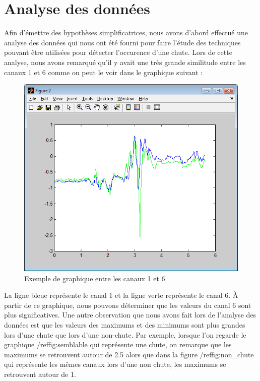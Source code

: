 \documentclass[12pt,letterpaper]{article}
\begin{document}
\section{Analyse des données} %
Afin d'émettre des hypothèses simplificatrices, nous avons d'abord effectué une analyse des données qui nous ont été fourni pour faire l'étude des techniques pouvant être utilisées pour détecter l'occurence d'une chute. Lors de cette analyse, nous avons remarqué qu'il y avait une très grande similitude entre les canaux 1 et 6 comme on peut le voir dans le graphique suivant :

\begin{figure}
\centering
\includegraphics[scale=0.5]{images/semblable.png}
\caption{Exemple de graphique entre les canaux 1 et 6}
\label{fig:semblable}
\end{figure}

La ligne bleue représente le canal 1 et la ligne verte représente le canal 6. À partir de ce graphique, nous pouvons déterminer que les valeurs du canal 6 sont plus significatives. Une autre observation que nous avons fait lors de l'analyse des données est que les valeurs des maximums et des minimums sont plus grandes lors d'une chute que lors d'une non-chute. Par exemple, lorsque l'on regarde le graphique /ref{fig:semblable} qui représente une chute, on remarque que les maximums se retrouvent autour de 2.5 alors que dans la figure /ref{fig:non\_chute} qui représente les mêmes canaux lors d'une non chute, les maximums se retrouvent autour de 1.
\end{document}
